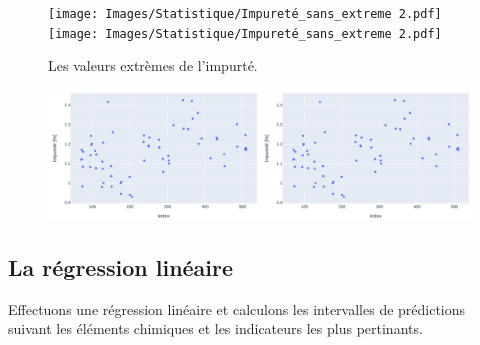 \documentclass[12pt]{article}
\begin{document}
\begin{figure}[H]
    \centering
    \begin{adjustbox}{width=1.3\textwidth,center}
        \texttt{[image: Images/Statistique/Impureté\_sans\_extreme 2.pdf]}
        \texttt{[image: Images/Statistique/Impureté\_sans\_extreme 2.pdf]}
    \end{adjustbox}
    \caption{Les valeurs extrèmes de l'impurté.}
    \label{fig:Extreme}
\end{figure}



\begin{figure}[H]
    \centering
    \begin{adjustbox}{width=1.3\textwidth,center}
        \includegraphics[scale=1]{Images/Statistique/Essais.pdf}
    \end{adjustbox}
\end{figure}

\subsection{La régression linéaire }


Effectuons une régression linéaire et calculons les intervalles de  prédictions 
suivant les éléments chimiques et les indicateurs les plus pertinants.
\end{document}
